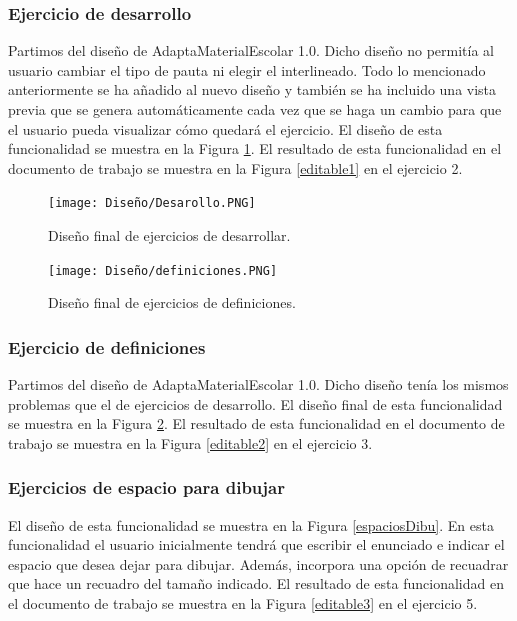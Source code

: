 \subsubsection{Ejercicio de desarrollo}
Partimos del diseño de AdaptaMaterialEscolar 1.0. Dicho diseño no permitía al usuario cambiar el tipo de pauta ni elegir el interlineado. Todo lo mencionado anteriormente se ha añadido al nuevo diseño y también se ha incluido una vista previa que se genera automáticamente cada vez que se haga un cambio para que el usuario pueda visualizar cómo quedará el ejercicio. El diseño de esta funcionalidad se muestra en la Figura \ref{DesarrolloFinal}. El resultado de esta funcionalidad en el documento de trabajo se muestra en la Figura \ref{editable1} en el ejercicio 2.

\begin{figure}[ht!]
  \centering
  \texttt{[image: Diseño/Desarollo.PNG]}
  \caption{Diseño final de ejercicios de desarrollar.}
  \label{DesarrolloFinal}
\end{figure}

\begin{figure}[ht!]
  \centering
  \texttt{[image: Diseño/definiciones.PNG]}
  \caption{Diseño final de ejercicios de definiciones.}
  \label{defi}
\end{figure}

\subsubsection{Ejercicio de definiciones}
Partimos del diseño de AdaptaMaterialEscolar 1.0. Dicho diseño tenía los mismos problemas que el de ejercicios de desarrollo. El diseño final de esta funcionalidad se muestra en la Figura \ref{defi}. El resultado de esta funcionalidad en el documento de trabajo se muestra en la Figura \ref{editable2} en el ejercicio 3.


\subsubsection{Ejercicios de espacio para dibujar}
El diseño de esta funcionalidad se muestra en la Figura \ref{espaciosDibu}. En esta funcionalidad el usuario inicialmente tendrá que escribir el enunciado e indicar el espacio que desea dejar para dibujar. Además, incorpora una opción de recuadrar que hace un recuadro del tamaño indicado. El resultado de esta funcionalidad en el documento de trabajo se muestra en la Figura \ref{editable3} en el ejercicio 5.






